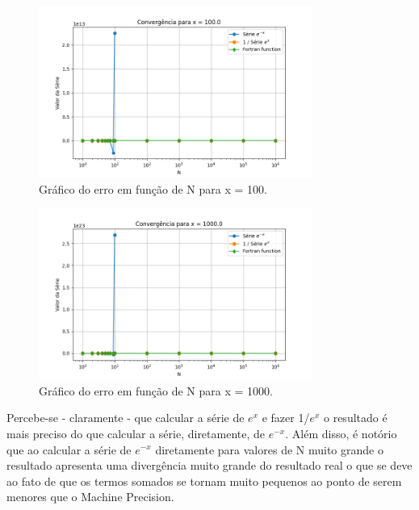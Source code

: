 \documentclass[12pt, a4paper]{article} %
\begin{document}
    \begin{figure}[H]
        \centering
        \includegraphics[width=0.8\textwidth]{../images/grafico_x_100.0.png}
        \caption{Gr\'afico do erro em fun\c{c}\~ao de N para x = 100.}
    \end{figure}

    \begin{figure}[H]
        \centering
        \includegraphics[width=0.8\textwidth]{../images/grafico_x_1000.0.png}
        \caption{Gr\'afico do erro em fun\c{c}\~ao de N para x = 1000.}
    \end{figure}

    Percebe-se - claramente - que calcular a s\'erie de $e^x$ e fazer 1/$e^x$ o resultado \'e mais preciso do que calcular a s\'erie, diretamente, de $e^{-x}$. Al\'em disso, \'e not\'orio que ao calcular a s\'erie de $e^{-x}$  diretamente para valores de N muito grande o resultado apresenta uma diverg\^encia muito grande do resultado real o que se deve ao fato de que os termos somados se tornam muito pequenos ao ponto de serem menores que o Machine Precision.
\end{document}
